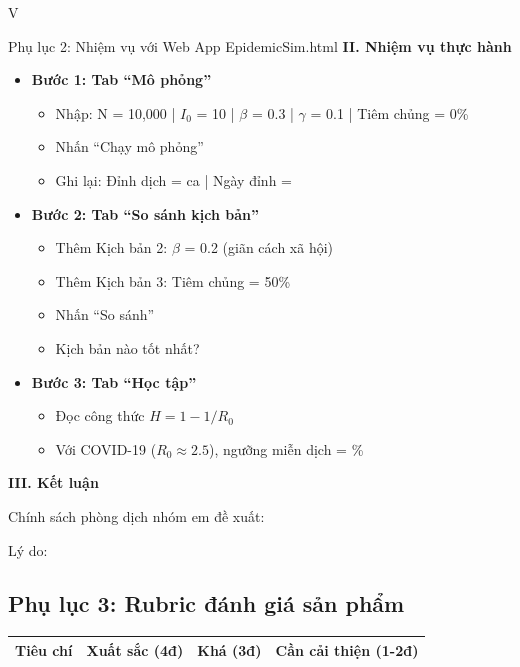 \documentclass[12pt,a4paper]{article}
\begin{document}
\begin{competitionsection}{V}
\begin{phieuhoc_tap_box}{Phụ lục 2: Nhiệm vụ với Web App EpidemicSim.html}
\textbf{II. Nhiệm vụ thực hành}
\begin{itemize}[leftmargin=*,noitemsep]
\item \textbf{Bước 1: Tab ``Mô phỏng''}
    \begin{itemize}
    \item Nhập: N = 10,000 | $I_0$ = 10 | $\beta$ = 0.3 | $\gamma$ = 0.1 | Tiêm chủng = 0\%
    \item Nhấn ``Chạy mô phỏng''
    \item Ghi lại: Đỉnh dịch = \underline{\hspace{2cm}} ca | Ngày đỉnh = \underline{\hspace{2cm}}
    \end{itemize}
\item \textbf{Bước 2: Tab ``So sánh kịch bản''}
    \begin{itemize}
    \item Thêm Kịch bản 2: $\beta$ = 0.2 (giãn cách xã hội)
    \item Thêm Kịch bản 3: Tiêm chủng = 50\%
    \item Nhấn ``So sánh''
    \item Kịch bản nào tốt nhất? \underline{\hspace{6cm}}
    \end{itemize}
\item \textbf{Bước 3: Tab ``Học tập''}
    \begin{itemize}
    \item Đọc công thức $H = 1 - 1/R_0$
    \item Với COVID-19 ($R_0 \approx 2.5$), ngưỡng miễn dịch = \underline{\hspace{2cm}}\%
    \end{itemize}
\end{itemize}

\textbf{III. Kết luận}

Chính sách phòng dịch nhóm em đề xuất: \underline{\hspace{0.8\textwidth}}

Lý do: \underline{\hspace{0.9\textwidth}}
\end{phieuhoc_tap_box}

\newpage
\subsection*{Phụ lục 3: Rubric đánh giá sản phẩm}
\begin{tabularx}{\linewidth}{@{} >{\raggedright\arraybackslash}p{3cm} >{\raggedright\arraybackslash}X >{\raggedright\arraybackslash}X >{\raggedright\arraybackslash}X @{}}
    \toprule
    \rowcolor{TableHeader}
    \sffamily\bfseries Tiêu chí & \sffamily\bfseries Xuất sắc (4đ) & \sffamily\bfseries Khá (3đ) & \sffamily\bfseries Cần cải thiện (1-2đ) \\
    \midrule
    

\end{tabularx}
\end{competitionsection}
\end{document}
